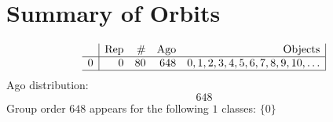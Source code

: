 \documentclass{article}
\newcommand\setTBstruts{\def\T{\rule{0pt}{2.6ex}}%
\def\B{\rule[-1.2ex]{0pt}{0pt}}}
\begin{document}
 
\setTBstruts



{\allowdisplaybreaks%






%



\section{Summary of Orbits}
$$
\begin{array}{r|*{4}{r}|}
 & \mbox{Rep} & \# & \mbox{Ago} & \mbox{Objects}\\
\hline
0 & 0 & 80 & 648 & 0, 1, 2, 3, 4, 5, 6, 7, 8, 9, 10, \ldots\\
\hline
\end{array}
$$
Ago distribution: 
$$
648
$$
Group order $648$ appears for the following $1$ classes: $
\{ 0 \}$\\
}
\end{document}
